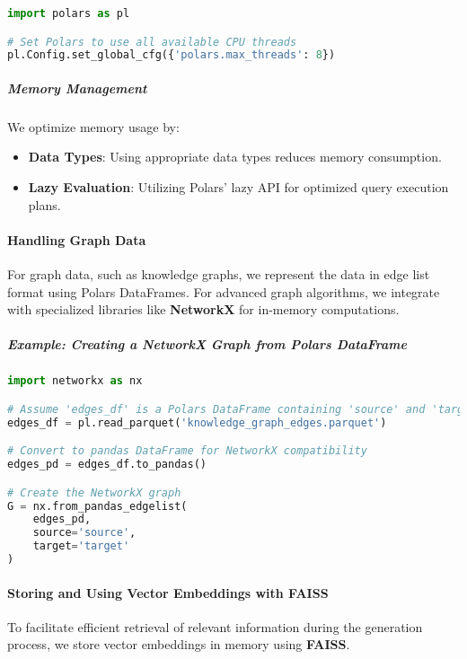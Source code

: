 \documentclass[12pt, a4paper]{article}
\begin{document}
\begin{lstlisting}[language=Python, caption=Configuring Polars to use all CPU cores, label=lst:polars_threads]
import polars as pl

# Set Polars to use all available CPU threads
pl.Config.set_global_cfg({'polars.max_threads': 8})
\end{lstlisting}

\subparagraph{Memory Management}

We optimize memory usage by:

\begin{itemize}
    \item \textbf{Data Types}: Using appropriate data types reduces memory consumption.
    \item \textbf{Lazy Evaluation}: Utilizing Polars' lazy API for optimized query execution plans.
\end{itemize}

\paragraph{Handling Graph Data}

For graph data, such as knowledge graphs, we represent the data in edge list format using Polars DataFrames. For advanced graph algorithms, we integrate with specialized libraries like \textbf{NetworkX} for in-memory computations.

\subparagraph{Example: Creating a NetworkX Graph from Polars DataFrame}

\begin{lstlisting}[language=Python, caption=Converting edge list DataFrame to NetworkX graph, label=lst:networkx_graph]
import networkx as nx

# Assume 'edges_df' is a Polars DataFrame containing 'source' and 'target' columns
edges_df = pl.read_parquet('knowledge_graph_edges.parquet')

# Convert to pandas DataFrame for NetworkX compatibility
edges_pd = edges_df.to_pandas()

# Create the NetworkX graph
G = nx.from_pandas_edgelist(
    edges_pd,
    source='source',
    target='target'
)
\end{lstlisting}

\paragraph{Storing and Using Vector Embeddings with FAISS}

To facilitate efficient retrieval of relevant information during the generation process, we store vector embeddings in memory using \textbf{FAISS}.
\end{document}
